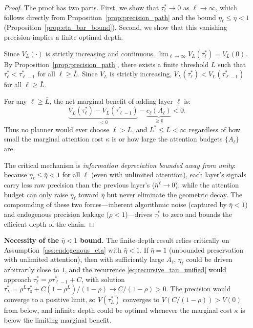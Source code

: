 \begin{proof}
The proof has two parts. First, we show that $\tau^{*}_{\ell} \to 0$ as $\ell \to \infty$, which follows directly from Proposition~\ref{prop:precision_path} and the bound $\eta_\ell \leq \bar{\eta} < 1$ (Proposition~\ref{prop:eta_bar_bound}). Second, we show that this vanishing precision implies a finite optimal depth.

Since $V_L(\cdot)$ is strictly increasing and continuous, $\lim_{\ell \to \infty} V_L(\tau^{*}_{\ell}) = V_L(0)$. By Proposition~\ref{prop:precision_path}, there exists a finite threshold $\bar{L}$ such that $\tau^{*}_{\ell} < \tau^{*}_{\ell-1}$ for all $\ell \geq \bar{L}$. Since $V_L$ is strictly increasing, $V_L(\tau^{*}_{\ell}) < V_L(\tau^{*}_{\ell-1})$ for all $\ell \geq \bar{L}$.

For any $\ell \geq \bar{L}$, the net marginal benefit of adding layer $\ell$ is:
\begin{equation*}
\underbrace{V_L(\tau^{*}_{\ell}) - V_L(\tau^{*}_{\ell-1})}_{< 0} - \underbrace{c_{\ell}(A_{\ell})}_{\geq 0} < 0.
\end{equation*}
Thus no planner would ever choose $\ell > \bar{L}$, and $L^{*} \leq \bar{L} < \infty$ regardless of how small the marginal attention cost $\kappa$ is or how large the attention budgets $\{A_\ell\}$ are.

The critical mechanism is \emph{information depreciation bounded away from unity}: because $\eta_\ell \leq \bar{\eta} < 1$ for all $\ell$ (even with unlimited attention), each layer's signals carry less raw precision than the previous layer's ($\bar{\eta}^{\,\ell} \to 0$), while the attention budget can only raise $\eta_\ell$ toward $\bar{\eta}$ but never eliminate the geometric decay. The compounding of these two forces---inherent algorithmic noise (captured by $\bar{\eta} < 1$) and endogenous precision leakage ($\rho < 1$)---drives $\tau^{*}_{\ell}$ to zero and bounds the efficient depth of the chain.
\end{proof}

\vspace{1em}
\noindent\textbf{Necessity of the $\bar{\eta} < 1$ bound.}
The finite-depth result relies critically on Assumption~\ref{ass:endogenous_eta} with $\bar{\eta} < 1$. If $\bar{\eta} = 1$ (unbounded preservation with unlimited attention), then with sufficiently large $A_\ell$, $\eta_\ell$ could be driven arbitrarily close to $1$, and the recurrence \eqref{eq:recursive_tau_unified} would approach $\tau^{*}_{\ell} = \rho \tau^{*}_{\ell-1} + C$, with solution $\tau^{*}_{L} = \rho^{L}\tau^{*}_{0} + C(1-\rho^{L})/(1-\rho) \to C/(1-\rho) > 0$. The precision would converge to a positive limit, so $V(\tau^{*}_{L})$ converges to $V(C/(1-\rho)) > V(0)$ from below, and infinite depth could be optimal whenever the marginal cost $\kappa$ is below the limiting marginal benefit.

